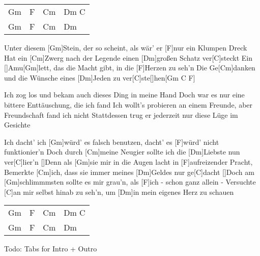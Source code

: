 

\begin{guitar}
	{\footnotesize\begin{tabular}{l|l|l|l}
			Gm & F & Cm & Dm C \optionalChord{F} \\
			Gm & F & Cm & Dm 
	\end{tabular}}
	
	Unter diesem [Gm]Stein, der so scheint, als wär' er [F]nur ein Klumpen Dreck
	Hat ein [Cm]Zwerg nach der Legende einen [Dm]großen Schatz ver[C]steckt
	Ein []Amu[Gm]lett, das die Macht gibt, in die [F]Herzen zu seh'n
	Die Ge[Cm]danken und die Wünsche eines [Dm]Jeden zu ver[C]ste[]hen[Gm C F]{}
	
	Ich zog los und bekam auch dieses Ding in meine Hand
	Doch war es nur eine bittere Enttäuschung, die ich fand
	Ich wollt's probieren an einem Freunde, aber Freundschaft fand ich nicht
	Stattdessen trug er jederzeit nur diese Lüge im Gesichte
	
	Ich dacht' ich [Gm]würd' es falsch benutzen, dacht' es [F]würd' nicht funktionier'n
	Doch durch [Cm]meine Neugier sollte ich die [Dm]Liebste nun ver[C]lier'n
	[]Denn als [Gm]sie mir in die Augen lacht in [F]aufreizender Pracht,
	Bemerkte [Cm]ich, dass sie immer meines [Dm]Geldes nur ge[C]dacht
	[]Doch am [Gm]schlimmmsten sollte es mir grau'n, als [F]ich - schon ganz allein -
	Versuchte [C]an mir selbst hinab zu seh'n, um [Dm]in mein eigenes Herz zu schauen
	
	{\footnotesize\begin{tabular}{l|l|l|l}
			Gm & F & Cm & Dm C \optionalChord{F} \\
			Gm & F & Cm & Dm 
	\end{tabular}}
\end{guitar}

{\color{gray}Todo: Tabs for Intro + Outro}

